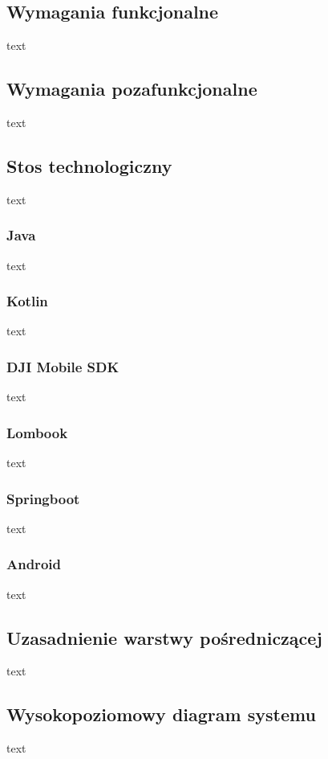 \subsection{Wymagania funkcjonalne}
\hspace{1cm}text
\subsection{Wymagania pozafunkcjonalne}
\hspace{1cm}text
\subsection{Stos technologiczny}
\hspace{1cm}text
\subsubsection{Java}
\hspace{1cm}text
\subsubsection{Kotlin}
\hspace{1cm}text
\subsubsection{DJI Mobile SDK}
\hspace{1cm}text
\subsubsection{Lombook}
\hspace{1cm}text
\subsubsection{Springboot}
\hspace{1cm}text
\subsubsection{Android}
\hspace{1cm}text
\subsection{Uzasadnienie warstwy pośredniczącej}
\hspace{1cm}text
\subsection{Wysokopoziomowy diagram systemu}
\hspace{1cm}text
